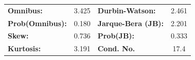 \documentclass{article}
\begin{document}
\begin {table}
\begin{center}
    \begin{tabular}{lclc}
    \textbf{Omnibus:}       &  3.425 & \textbf{  Durbin-Watson:     } &    2.461  \\
    \textbf{Prob(Omnibus):} &  0.180 & \textbf{  Jarque-Bera (JB):  } &    2.201  \\
    \textbf{Skew:}          &  0.736 & \textbf{  Prob(JB):          } &    0.333  \\
    \textbf{Kurtosis:}      &  3.191 & \textbf{  Cond. No.          } &     17.4  \\
    \bottomrule
    \end{tabular}
    
    \end{center}
    
    \end{table}


    
\end{document}
